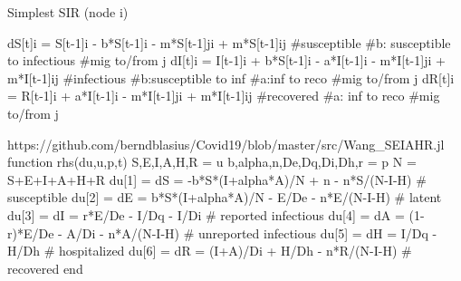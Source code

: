 Simplest SIR (node i)

  dS[t]i = S[t-1]i - b*S[t-1]i - m*S[t-1]ji + m*S[t-1]ij  #susceptible   #b: susceptible to infectious  #mig to/from j
  dI[t]i = I[t-1]i + b*S[t-1]i - a*I[t-1]i - m*I[t-1]ji + m*I[t-1]ij #infectious #b:susceptible to inf #a:inf to reco  #mig to/from j  
  dR[t]i = R[t-1]i + a*I[t-1]i - m*I[t-1]ji + m*I[t-1]ij  #recovered  #a: inf to reco  #mig to/from j






https://github.com/berndblasius/Covid19/blob/master/src/Wang_SEIAHR.jl
function rhs(du,u,p,t)
  S,E,I,A,H,R = u
  b,alpha,n,De,Dq,Di,Dh,r = p
  N = S+E+I+A+H+R
  du[1] = dS = -b*S*(I+alpha*A)/N + n - n*S/(N-I-H)   # susceptible
  du[2] = dE = b*S*(I+alpha*A)/N - E/De - n*E/(N-I-H) # latent
  du[3] = dI = r*E/De - I/Dq - I/Di                   # reported infectious
  du[4] = dA = (1-r)*E/De - A/Di - n*A/(N-I-H)        # unreported infectious
  du[5] = dH = I/Dq - H/Dh                            # hospitalized
  du[6] = dR = (I+A)/Di + H/Dh - n*R/(N-I-H)          # recovered
end

